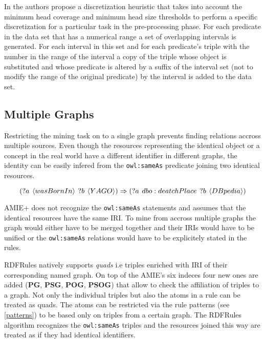 In \cite{Zeman2020} the authors propose a discretization heuristic that takes into account the minimum head coverage and minimum head size thresholds to perform a specific discretization for a particular task in the pre-processing phase. For each predicate in the data set that has a numerical range a set of overlapping intervals is generated. For each interval in this set and for each predicate's triple with the number in the range of the interval a copy of the triple whose object is substituted and whose predicate is altered by a suffix of the interval set (not to modify the range of the original predicate) by the interval is added to the data set.   

\subsection{Multiple Graphs}

Restricting the mining task on to a single graph prevents finding relations accross multiple sources. Even though the resources representing the identical object or a concept in the real world have a different identifier in different graphs, the identity can be easily infered from the \verb|owl:sameAs| predicate joining two identical resources.

$$(?a \hspace{0.4em} \langle wasBornIn \rangle \hspace{0.4em} ?b \hspace{0.4em} \langle YAGO \rangle) \Rightarrow (?a \hspace{0.4em} dbo:deatchPlace \hspace{0.4em} ?b \hspace{0.4em} \langle DBpedia \rangle)$$

AMIE+ does not recognize the \verb|owl:sameAs| statements and assumes that the identical resources have the same IRI. To mine from accross multiple graphs the graph would either have to be merged together and their IRIs would have to be unified or the \verb|owl:sameAs| relations would have to be explicitely stated in the rules.

RDFRules natively supports \textit{quads} i.e triples enriched with IRI of their corresponding named graph. On top of the AMIE's six indeces four new ones are added (\textbf{PG}, \textbf{PSG}, \textbf{POG}, \textbf{PSOG}) that allow to check the affiliation of triples to a graph. Not only the individual triples but also the atoms in a rule can be treated as quads. The atoms can be restricted via the rule patterns (see \ref{patterns}) to be based only on triples from a certain graph. The RDFRules algorithm recognizes the \verb|owl:sameAs| triples and the resources joined this way are treated as if they had identical identifiers.

